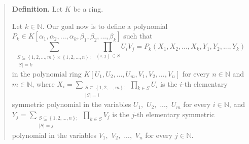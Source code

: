 \documentclass[12pt,final,notitlepage,onecolumn,german]{article}%
\begin{document}
\begin{quote}
\textbf{Definition.} Let $K$ be a ring.

Let $k\in\mathbb{N}$. Our goal now is to define a polynomial $P_{k}\in
K\left[  \alpha_{1},\alpha_{2},...,\alpha_{k},\beta_{1},\beta_{2}%
,...,\beta_{k}\right]  $ such that%
\begin{equation}
\sum_{\substack{S\subseteq\left\{  1,2,...,m\right\}  \times\left\{
1,2,...,n\right\}  ;\\\left\vert S\right\vert =k}}\prod_{\left(  i,j\right)
\in S}U_{i}V_{j}=P_{k}\left(  X_{1},X_{2},...,X_{k},Y_{1},Y_{2},...,Y_{k}%
\right)  \label{Pk1}%
\end{equation}
in the polynomial ring $K\left[  U_{1},U_{2},...,U_{m},V_{1},V_{2}%
,...,V_{n}\right]  $ for every $n\in\mathbb{N}$ and $m\in\mathbb{N}$, where
$X_{i}=\sum\limits_{\substack{S\subseteq\left\{  1,2,...,m\right\}
;\\\left\vert S\right\vert =i}}\prod\limits_{k\in S}U_{i}$ is the $i$-th
elementary symmetric polynomial in the variables $U_{1},$ $U_{2},$ $...,$
$U_{m}$ for every $i\in\mathbb{N}$, and $Y_{j}=\sum
\limits_{\substack{S\subseteq\left\{  1,2,...,n\right\}  ;\\\left\vert
S\right\vert =j}}\prod\limits_{k\in S}V_{j}$ is the $j$-th elementary
symmetric polynomial in the variables $V_{1},$ $V_{2},$ $...,$ $V_{n}$ for
every $j\in\mathbb{N}$.


\end{quote}
\end{document}
